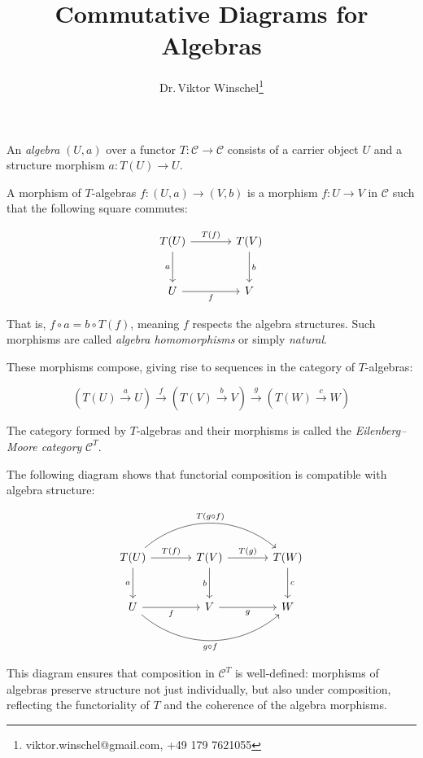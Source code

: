\documentclass{article}
\title{Commutative Diagrams for Algebras}
\author{Dr.\,Viktor Winschel\footnote{viktor.winschel@gmail.com, +49 179 7621055}}
\date{}
\begin{document}
\maketitle

An \emph{algebra} \((U, a)\) over a functor \(T \colon \mathcal{C} \to \mathcal{C}\) consists of a carrier object \(U\) and a structure morphism \(a \colon T(U) \to U\).

A morphism of \(T\)-algebras \(f \colon (U, a) \to (V, b)\) is a morphism \(f \colon U \to V\) in \(\mathcal{C}\) such that the following square commutes:

\begin{equation}
\label{eq:naturality}
\begin{tikzcd}[row sep=large, column sep=large]
T(U) \arrow[r,"T(f)"] \arrow[d,"a"'] & T(V) \arrow[d,"b"] \\
U \arrow[r,"f"'] & V
\end{tikzcd}
\end{equation}

That is, \(f \circ a = b \circ T(f)\), meaning \(f\) respects the algebra structures. Such morphisms are called \emph{algebra homomorphisms} or simply \emph{natural}.

These morphisms compose, giving rise to sequences in the category of \(T\)-algebras:

\begin{equation}
\label{eq:algebra-morphism-sequence}
\left( T(U) \xrightarrow{a} U \right) \xrightarrow{f}
\left( T(V) \xrightarrow{b} V \right) \xrightarrow{g}
\left( T(W) \xrightarrow{c} W \right)
\end{equation}

The category formed by \(T\)-algebras and their morphisms is called the \emph{Eilenberg–Moore category} \(\mathcal{C}^T\).

The following diagram shows that functorial composition is compatible with algebra structure:

\begin{equation}
\label{eq:composition}
\begin{tikzcd}[row sep=large, column sep=large]
T(U) \arrow[r,"T(f)"] \arrow[d,"a"'] \arrow[rr,bend left=40,"T(g \circ f)"] &
T(V) \arrow[r,"T(g)"] \arrow[d,"b"'] &
T(W) \arrow[d,"c"] \\
U \arrow[r,"f"'] \arrow[rr,bend right=40,"g \circ f"'] &
V \arrow[r,"g"'] &
W
\end{tikzcd}
\end{equation}

This diagram ensures that composition in \(\mathcal{C}^T\) is well-defined: morphisms of algebras preserve structure not just individually, but also under composition, reflecting the functoriality of \(T\) and the coherence of the algebra morphisms.
\end{document}
